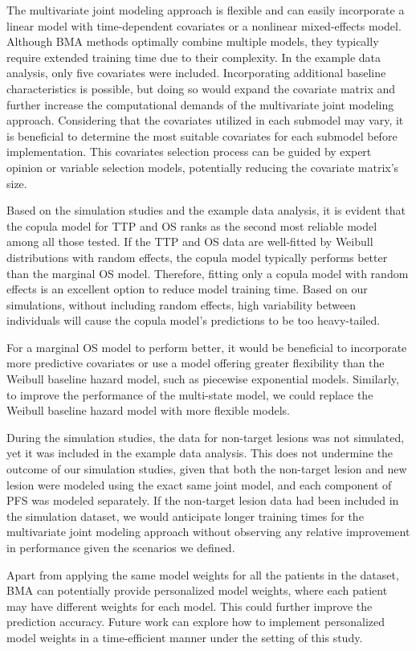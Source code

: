 The multivariate joint modeling approach is flexible and can easily incorporate a linear model with time-dependent covariates or a nonlinear mixed-effects model. Although \ac{BMA} methods optimally combine multiple models, they typically require extended training time due to their complexity. In the example data analysis, only five covariates were included. Incorporating additional baseline characteristics is possible, but doing so would expand the covariate matrix and further increase the computational demands of the multivariate joint modeling approach. Considering that the covariates utilized in each submodel may vary, it is beneficial to determine the most suitable covariates for each submodel before implementation. This covariates selection process can be guided by expert opinion or variable selection models, potentially reducing the covariate matrix's size.

Based on the simulation studies and the example data analysis, it is evident that the copula model for \ac{TTP} and \ac{OS} ranks as the second most reliable model among all those tested. If the \ac{TTP} and \ac{OS} data are well-fitted by Weibull distributions with random effects, the copula model typically performs better than the marginal \ac{OS} model. Therefore, fitting only a copula model with random effects is an excellent option to reduce model training time. Based on our simulations, without including random effects, high variability between individuals will cause the copula model's predictions to be too heavy-tailed.

For a marginal \ac{OS} model to perform better, it would be beneficial to incorporate more predictive covariates or use a model offering greater flexibility than the Weibull baseline hazard model, such as piecewise exponential models. Similarly, to improve the performance of the multi-state model, we could replace the Weibull baseline hazard model with more flexible models.

During the simulation studies, the data for non-target lesions was not simulated, yet it was included in the example data analysis. This does not undermine the outcome of our simulation studies, given that both the non-target lesion and new lesion were modeled using the exact same joint model, and each component of \ac{PFS} was modeled separately. If the non-target lesion data had been included in the simulation dataset, we would anticipate longer training times for the multivariate joint modeling approach without observing any relative improvement in performance given the scenarios we defined.

Apart from applying the same model weights for all the patients in the dataset, \ac{BMA} can potentially provide personalized model weights, where each patient may have different weights for each model. This could further improve the prediction accuracy. Future work can explore how to implement personalized model weights in a time-efficient manner under the setting of this study.